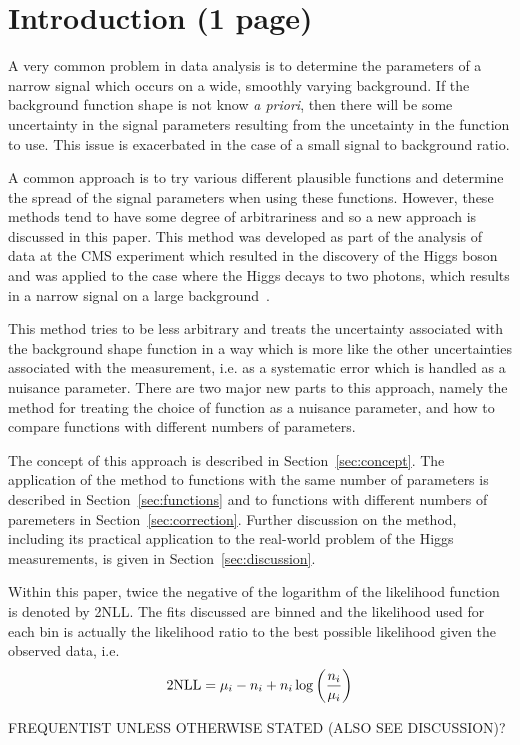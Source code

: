\section{Introduction (1 page)}
\label{sec:introduction}

A very common problem in data analysis is to determine the parameters of
a narrow signal which occurs on a wide, smoothly varying background. If the
background function shape is not know {\it a priori}, then there will be 
some uncertainty in the signal parameters resulting from the uncetainty in
the function to use. This issue is exacerbated in the case of a small signal to
background ratio.

A common approach is to try various different plausible functions and 
determine the spread of the signal parameters when using these functions.
However, these methods tend to have some degree of arbitrariness and so
a new approach is discussed in this paper.
This method was developed as part of the analysis of data at the CMS experiment
which resulted in the discovery of the Higgs
boson and was applied to the case where the Higgs decays to two photons, which
results in a narrow signal on a large background~\cite{ref:introduction:higgs}.

This method tries to be less 
arbitrary and treats the uncertainty associated with the
background shape function in a way
which is more like the other
uncertainties associated with the measurement, i.e. as a systematic error
which is handled as a nuisance parameter.
There are two major new parts to this approach, namely the method for
treating the choice of function as a nuisance parameter, and how to compare 
functions with different numbers of parameters.


The concept of this approach is described in Section~\ref{sec:concept}.
The application of the method to functions with the same number of parameters
is described in Section~\ref{sec:functions} and to functions with different
numbers of paremeters in Section~\ref{sec:correction}. Further discussion on
the method, including its practical application to the real-world problem of
the Higgs measurements, is given in Section~\ref{sec:discussion}.

Within this paper, twice the negative of the logarithm of the likelihood
function is denoted by 2NLL. The fits discussed are binned and the 
likelihood used for each bin is actually the likelihood ratio to the best
possible likelihood given the observed data, i.e.
\begin{displaymath}
{\rm 2NLL} = \mu_i - n_i + n_i \log\left(\frac{n_i}{\mu_i}\right)
\end{displaymath}

FREQUENTIST UNLESS OTHERWISE STATED (ALSO SEE DISCUSSION)?
